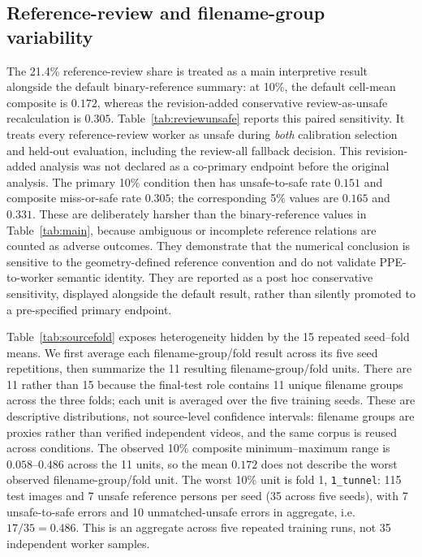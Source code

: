 \documentclass[iicol,pdflatex,sn-mathphys-num]{sn-jnl}
\begin{document}
\subsection{Reference-review and filename-group variability}

The 21.4\% reference-review share is treated as a main interpretive result alongside the default binary-reference summary: at 10\%, the default cell-mean composite is $0.172$, whereas the revision-added conservative review-as-unsafe recalculation is $0.305$. Table~\ref{tab:reviewunsafe} reports this paired sensitivity. It treats every reference-review worker as unsafe during \emph{both} calibration selection and held-out evaluation, including the review-all fallback decision. This revision-added analysis was not declared as a co-primary endpoint before the original analysis. The primary 10\% condition then has unsafe-to-safe rate $0.151$ and composite miss-or-safe rate $0.305$; the corresponding 5\% values are $0.165$ and $0.331$. These are deliberately harsher than the binary-reference values in Table~\ref{tab:main}, because ambiguous or incomplete reference relations are counted as adverse outcomes. They demonstrate that the numerical conclusion is sensitive to the geometry-defined reference convention and do not validate PPE-to-worker semantic identity. They are reported as a post hoc conservative sensitivity, displayed alongside the default result, rather than silently promoted to a pre-specified primary endpoint.

Table~\ref{tab:sourcefold} exposes heterogeneity hidden by the 15 repeated seed--fold means. We first average each filename-group/fold result across its five seed repetitions, then summarize the 11 resulting filename-group/fold units. There are 11 rather than 15 because the final-test role contains 11 unique filename groups across the three folds; each unit is averaged over the five training seeds. These are descriptive distributions, not source-level confidence intervals: filename groups are proxies rather than verified independent videos, and the same corpus is reused across conditions. The observed 10\% composite minimum--maximum range is $0.058$--$0.486$ across the 11 units, so the mean $0.172$ does not describe the worst observed filename-group/fold unit. The worst 10\% unit is fold 1, \texttt{1\_tunnel}: 115 test images and 7 unsafe reference persons per seed (35 across five seeds), with 7 unsafe-to-safe errors and 10 unmatched-unsafe errors in aggregate, i.e. $17/35=0.486$. This is an aggregate across five repeated training runs, not 35 independent worker samples.
\end{document}
